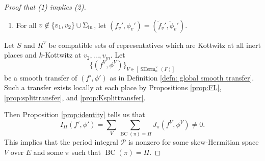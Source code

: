 \documentclass[11pt, reqno]{amsart}
\numberwithin{equation}{subsection}
\theoremstyle{plain}
\theoremstyle{definition}
\newcommand{\wt}{\widetilde}
\renewcommand{\P}{\mathcal P}
\DeclareMathOperator{\SHerm}{SHerm}
\newcommand{\inert}{\textnormal{in}}
\begin{document}
\begin{proof}[Proof that (1) implies (2)]
\begin{enumerate}[(1)]
By Proposition \ref{prop:Ksplittransfer},
we can suppose $k$ is large enough so that for $3 \le i \le m$,
there exists a test function $(f_{v_i}, \phi_{v_i})$
on the unitary side which is a smooth transfer
of $(\wt f_{v_i}', \wt \phi_{v_i}')$ for all $k$-Kottwitz
sets of representatives $S$ and $R^V$.

\item For all $v \not\in \{v_1, v_2\}
\cup \Sigma_\inert$, let $(f_v', \phi_v') = (\wt f_v', \wt \phi_v')$.
\end{enumerate}



Let $S$ and $R^V$ be compatible sets
of representatives which are Kottwitz at all inert
places and $k$-Kottwitz at $v_2, \dots, v_m$.
Let 
\[
    \{(f^V, \phi^V)\}_{V \in [\SHerm_n^\times(F)]}
\] 
be a smooth transfer of $(f', \phi')$ as
in Definition \ref{defn: global smooth transfer}. 
Such a transfer exists locally at each place
by Propositions \ref{prop:FL}, 
\ref{prop:splittransfer}, and 
\ref{prop:Ksplittransfer}.

Then Proposition \ref{prop:identity} tells us that
\[
    I_\Pi(f', \phi') 
    = \sum_{V}
    \sum_{\operatorname{BC}(\pi) = \Pi} J_{\pi}(f^{V}, \phi^{V}) \neq 0.
\]
This implies that the period integral
$\P$ is nonzero for some skew-Hermitian space $V$ over $E$ and
some $\pi$ such that $\operatorname{BC}(\pi) = \Pi$.
\end{proof}






\end{document}
